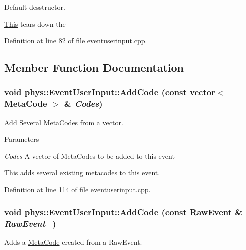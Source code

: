 Default desstructor. 

\hyperlink{structThis}{This} tears down the 

Definition at line 82 of file eventuserinput.cpp.



\subsection{Member Function Documentation}
\hypertarget{classphys_1_1EventUserInput_a6b6071496574fbb719ba4a5d97e74b52}{
\subsubsection[{AddCode}]{\setlength{\rightskip}{0pt plus 5cm}void phys::EventUserInput::AddCode (const vector$<$ {\bf MetaCode} $>$ \& {\em Codes})}}
\label{d7/df5/classphys_1_1EventUserInput_a6b6071496574fbb719ba4a5d97e74b52}


Add Several MetaCodes from a vector. 


\begin{DoxyParams}{Parameters}
\item[{\em Codes}]A vector of MetaCodes to be added to this event\end{DoxyParams}
\hyperlink{structThis}{This} adds several existing metacodes to this event. 

Definition at line 114 of file eventuserinput.cpp.

\hypertarget{classphys_1_1EventUserInput_a9b0787db5ed6e326c4932fd83798e118}{
\subsubsection[{AddCode}]{\setlength{\rightskip}{0pt plus 5cm}void phys::EventUserInput::AddCode (const {\bf RawEvent} \& {\em RawEvent\_\-})}}
\label{d7/df5/classphys_1_1EventUserInput_a9b0787db5ed6e326c4932fd83798e118}


Adds a \hyperlink{classphys_1_1MetaCode}{MetaCode} created from a RawEvent. 


